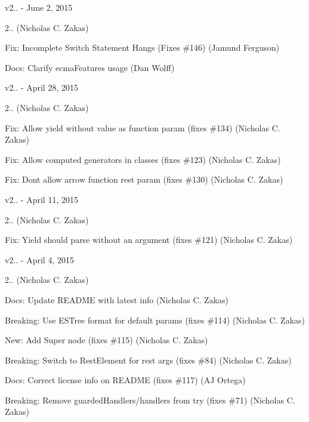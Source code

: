v2.. -\/ June 2, 2015


\begin{DoxyItemize}
\item 2.. (Nicholas C. Zakas)
\item Fix\+: Incomplete Switch Statement Hangs (Fixes \#146) (Jamund Ferguson)
\item Docs\+: Clarify ecma\+Features usage (Dan Wolff)
\end{DoxyItemize}

v2.. -\/ April 28, 2015


\begin{DoxyItemize}
\item 2.. (Nicholas C. Zakas)
\item Fix\+: Allow yield without value as function param (fixes \#134) (Nicholas C. Zakas)
\item Fix\+: Allow computed generators in classes (fixes \#123) (Nicholas C. Zakas)
\item Fix\+: Don\textquotesingle{}t allow arrow function rest param (fixes \#130) (Nicholas C. Zakas)
\end{DoxyItemize}

v2.. -\/ April 11, 2015


\begin{DoxyItemize}
\item 2.. (Nicholas C. Zakas)
\item Fix\+: Yield should parse without an argument (fixes \#121) (Nicholas C. Zakas)
\end{DoxyItemize}

v2.. -\/ April 4, 2015


\begin{DoxyItemize}
\item 2.. (Nicholas C. Zakas)
\item Docs\+: Update R\+E\+A\+D\+ME with latest info (Nicholas C. Zakas)
\item Breaking\+: Use E\+S\+Tree format for default params (fixes \#114) (Nicholas C. Zakas)
\item New\+: Add Super node (fixes \#115) (Nicholas C. Zakas)
\item Breaking\+: Switch to Rest\+Element for rest args (fixes \#84) (Nicholas C. Zakas)
\item Docs\+: Correct license info on R\+E\+A\+D\+ME (fixes \#117) (AJ Ortega)
\item Breaking\+: Remove guarded\+Handlers/handlers from try (fixes \#71) (Nicholas C. Zakas)
\end{DoxyItemize}

